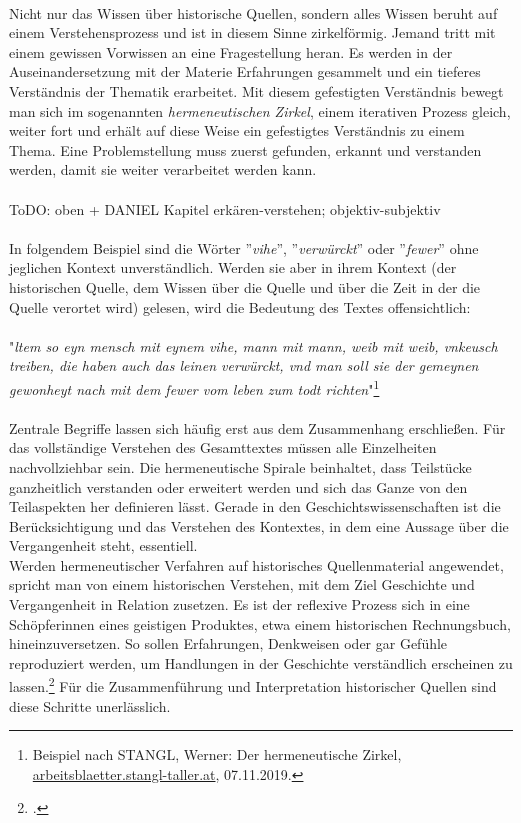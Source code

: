 \documentclass[12pt,a4paper]{article}
\begin{document}
\\
Nicht nur das Wissen über historische Quellen, sondern alles Wissen beruht auf einem Verstehensprozess und ist in diesem Sinne zirkelförmig. Jemand tritt mit einem gewissen Vorwissen an eine Fragestellung heran. Es werden in der Auseinandersetzung mit der Materie Erfahrungen gesammelt und ein tieferes Verständnis der Thematik erarbeitet. Mit diesem gefestigten Verständnis bewegt man sich im sogenannten  \textit{hermeneutischen Zirkel}, einem iterativen Prozess gleich, weiter fort und erhält auf diese Weise ein gefestigtes Verständnis zu einem Thema. Eine Problemstellung muss zuerst gefunden, erkannt und verstanden werden, damit sie weiter verarbeitet werden kann.
\\
\\
ToDO: oben + DANIEL Kapitel erkären-verstehen; objektiv-subjektiv
\\
\\
In folgendem Beispiel sind die Wörter ''\textit{vihe}'', ''\textit{verwürckt}'' oder ''\textit{fewer}'' ohne jeglichen Kontext unverständlich. Werden sie aber in ihrem Kontext (der historischen Quelle, dem Wissen über die Quelle und über die Zeit in der die Quelle verortet wird) gelesen, wird die Bedeutung des Textes offensichtlich:
\\
\\
"\textit{ltem so eyn mensch mit eynem vihe, mann mit mann, weib mit weib, vnkeusch treiben, die haben auch das leinen verwürckt, vnd man soll sie der gemeynen gewonheyt nach mit dem fewer vom leben zum todt richten}"\footnote{Beispiel nach STANGL, Werner: Der hermeneutische Zirkel, \protect\url{arbeitsblaetter.stangl-taller.at}, 07.11.2019.}
\\
\\
Zentrale Begriffe lassen sich häufig erst aus dem Zusammenhang erschließen. Für das vollständige Verstehen des Gesamttextes müssen alle Einzelheiten nachvollziehbar sein. Die hermeneutische Spirale beinhaltet, dass Teilstücke ganzheitlich verstanden oder erweitert werden und sich das Ganze von den Teilaspekten her definieren lässt. Gerade in den Geschichtswissenschaften ist die Berücksichtigung und das Verstehen des Kontextes, in dem eine Aussage über die Vergangenheit steht, essentiell.
\\
Werden hermeneutischer Verfahren auf historisches Quellenmaterial angewendet, spricht man von einem historischen Verstehen, mit dem Ziel Geschichte und Vergangenheit in Relation zusetzen. Es ist der reflexive Prozess sich in eine Schöpferinnen eines geistigen Produktes, etwa einem historischen Rechnungsbuch, hineinzuversetzen. So sollen Erfahrungen, Denkweisen oder gar Gefühle reproduziert werden, um Handlungen in der Geschichte verständlich erscheinen zu lassen.\footcite[][S.14-20]{detel2011geist} Für die Zusammenführung und Interpretation historischer Quellen sind diese Schritte unerlässlich. 
\end{document}
